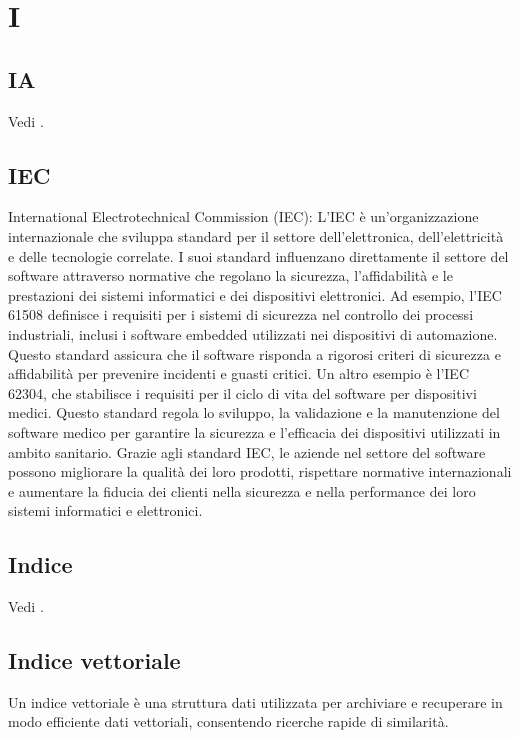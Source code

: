 \section{I}

\vspace{2em}
\subsection*{IA}
\par Vedi .

\vspace{2em}
\subsection*{IEC}
\par International Electrotechnical Commission (IEC): L'IEC è un'organizzazione internazionale che sviluppa standard per il settore dell'elettronica, dell'elettricità e delle tecnologie correlate. I suoi standard influenzano direttamente il settore del software attraverso normative che regolano la sicurezza, l'affidabilità e le prestazioni dei sistemi informatici e dei dispositivi elettronici.
Ad esempio, l'IEC 61508 definisce i requisiti per i sistemi di sicurezza nel controllo dei processi industriali, inclusi i software embedded utilizzati nei dispositivi di automazione. Questo standard assicura che il software risponda a rigorosi criteri di sicurezza e affidabilità per prevenire incidenti e guasti critici.
Un altro esempio è l'IEC 62304, che stabilisce i requisiti per il ciclo di vita del software per dispositivi medici. Questo standard regola lo sviluppo, la validazione e la manutenzione del software medico per garantire la sicurezza e l'efficacia dei dispositivi utilizzati in ambito sanitario.
Grazie agli standard IEC, le aziende nel settore del software possono migliorare la qualità dei loro prodotti, rispettare normative internazionali e aumentare la fiducia dei clienti nella sicurezza e nella performance dei loro sistemi informatici e elettronici.

\vspace{2em}
\subsection*{Indice}
\par Vedi .

\vspace{2em}
\subsection*{Indice vettoriale}
\par Un indice vettoriale è una struttura dati utilizzata per archiviare e recuperare in modo efficiente dati vettoriali, consentendo ricerche rapide di similarità.

